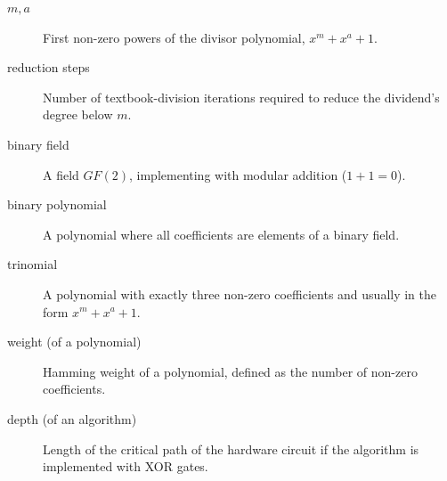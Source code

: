 \begin{description}

\item[$m, a$] First non-zero powers of the divisor polynomial, $x^m+x^a+1$.

\item[reduction steps] Number of textbook-division iterations required to reduce the dividend's degree below $m$.

\item[binary field] A field $GF(2)$, implementing with modular addition ($1+1=0$).

\item[binary polynomial] A polynomial where all coefficients are elements of a binary field.

\item[trinomial] A polynomial with exactly three non-zero coefficients and usually in the form $x^m+x^a+1$.

\item[weight (of a polynomial)] Hamming weight of a polynomial, defined as the number of non-zero coefficients.

\item[depth (of an algorithm)] Length of the critical path of the hardware circuit if the algorithm is implemented with XOR gates.

\end{description}